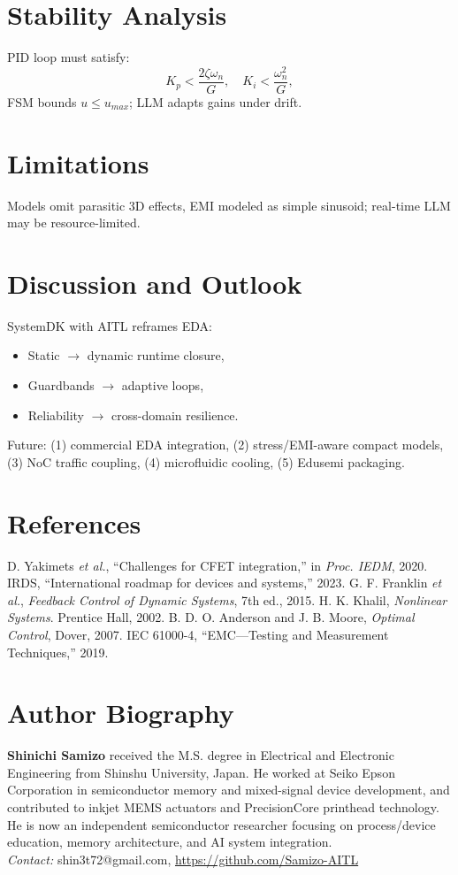 \documentclass[conference]{IEEEtran}
\begin{document}
\section{Stability Analysis}
PID loop must satisfy:
\begin{equation}
K_p < \frac{2\zeta\omega_n}{G}, \quad K_i < \frac{\omega_n^2}{G},
\end{equation}
FSM bounds $u \leq u_{max}$; LLM adapts gains under drift.

\section{Limitations}
Models omit parasitic 3D effects, EMI modeled as simple sinusoid; real-time LLM may be resource-limited.

\section{Discussion and Outlook}
SystemDK with AITL reframes EDA:
\begin{itemize}
\item Static $\rightarrow$ dynamic runtime closure,
\item Guardbands $\rightarrow$ adaptive loops,
\item Reliability $\rightarrow$ cross-domain resilience.
\end{itemize}
Future: (1) commercial EDA integration, (2) stress/EMI-aware compact models, (3) NoC traffic coupling, (4) microfluidic cooling, (5) Edusemi packaging.

\section*{References}
\begin{thebibliography}{1}
 D. Yakimets \emph{et al.}, ``Challenges for CFET integration,'' in \emph{Proc. IEDM}, 2020.
 IRDS, ``International roadmap for devices and systems,'' 2023.
 G. F. Franklin \emph{et al.}, \emph{Feedback Control of Dynamic Systems}, 7th ed., 2015.
 H. K. Khalil, \emph{Nonlinear Systems}. Prentice Hall, 2002.
 B. D. O. Anderson and J. B. Moore, \emph{Optimal Control}, Dover, 2007.
 IEC 61000-4, ``EMC—Testing and Measurement Techniques,'' 2019.
\end{thebibliography}

\section*{Author Biography}
\textbf{Shinichi Samizo} received the M.S. degree in Electrical and Electronic Engineering from Shinshu University, Japan. He worked at Seiko Epson Corporation in semiconductor memory and mixed-signal device development, and contributed to inkjet MEMS actuators and PrecisionCore printhead technology. He is now an independent semiconductor researcher focusing on process/device education, memory architecture, and AI system integration. \\
\textit{Contact:} shin3t72@gmail.com, \url{https://github.com/Samizo-AITL}
\end{document}
